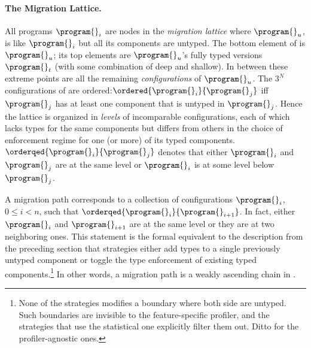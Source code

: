 \paragraph{The Migration Lattice.}  All programs $\program{}_i$ are nodes in the
\emph{migration lattice}  where ${\program{}_u}$, is like
${\program{}_i}$ but all its components are untyped. The bottom element of
 is ${\program{}_u}$; its top elements are
${\program{}_u}$'s fully typed versions $\program{}_t$ (with some combination of
deep and shallow). In between these extreme points are all the remaining
\emph{configurations} of $\program{}_u$. The $3^N$ configurations of
 are ordered:$\ordered{\program{}_i}{\program{}_j}$ iff
$\program{}_j$ has at least one component that is untyped in
$\program{}_j$. Hence the lattice is organized in \emph{levels} of incomparable
configurations, each of which lacks types for the same components but differs
from others in the choice of enforcement regime for one (or more) of its typed
components.  $\orderqed{\program{}_i}{\program{}_j}$ denotes that either
$\program{}_i$ and $\program{}_j$ are at the same level or $\program{}_i$ is at
some level below $\program{}_j$.

A migration path corresponds to a collection of configurations $\program{}_i$,
$0 \leq i < n$, such that $\orderqed{\program{}_i}{\program{}_{i+1}}$. In fact,
either $\program{}_i$ and $\program{}_{i+1}$ are at the same level or they are
at two neighboring ones.  This statement is the formal equivalent to the
description from the preceding section that strategies either add types to a
single previously untyped component or toggle the type enforcement of existing
typed components.\footnote{None of the strategies modifies a boundary where both
side are untyped. Such boundaries are invisible to the feature-specific
profiler, and the strategies that use the statistical one explicitly filter them
out. Ditto for the profiler-agnostic ones.}  In other words, a migration path is
a weakly ascending chain in
.



